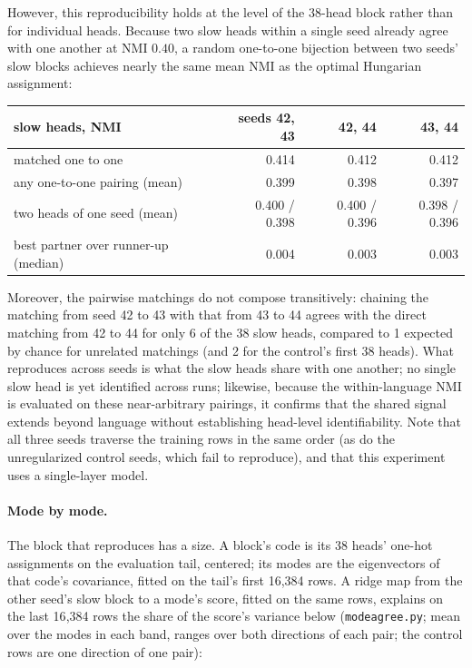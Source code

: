 However, this reproducibility holds at the level of the 38-head block
rather than for individual heads. Because two slow heads within a single
seed already agree with one another at NMI $0.40$, a random one-to-one
bijection between two seeds' slow blocks achieves nearly the same mean
NMI as the optimal Hungarian assignment:

\begin{center}\small\setlength{\tabcolsep}{4pt}
\begin{tabular}{@{}lrrr@{}}
\toprule
slow heads, NMI & seeds 42, 43 & 42, 44 & 43, 44 \\
\midrule
matched one to one & 0.414 & 0.412 & 0.412 \\
any one-to-one pairing (mean) & 0.399 & 0.398 & 0.397 \\
two heads of one seed (mean) & 0.400 / 0.398 & 0.400 / 0.396 & 0.398 / 0.396 \\
best partner over runner-up (median) & 0.004 & 0.003 & 0.003 \\
\bottomrule
\end{tabular}
\end{center}

\noindent Moreover, the pairwise matchings do not compose transitively:
chaining the matching from seed 42 to 43 with that from 43 to 44 agrees
with the direct matching from 42 to 44 for only 6 of the 38 slow heads,
compared to 1 expected by chance for unrelated matchings (and 2 for the
control's first 38 heads). What reproduces across seeds is what the slow heads
share with one another; no single slow head is yet identified across runs;
likewise, because the within-language NMI is evaluated on these
near-arbitrary pairings, it confirms that the shared signal extends
beyond language without establishing head-level identifiability. Note
that all three seeds traverse the training rows in the same order (as do
the unregularized control seeds, which fail to reproduce), and that this
experiment uses a single-layer model.

\paragraph{Mode by mode.}
\label{sec:slowmodes}
The block that reproduces has a size. A block's code is its 38 heads'
one-hot assignments on the evaluation tail, centered; its modes are the
eigenvectors of that code's covariance, fitted on the tail's first
16{,}384 rows. A ridge map from the other seed's slow block to a mode's
score, fitted on the same rows, explains on the last 16{,}384 rows the
share of the score's variance below (\texttt{modeagree.py}; mean over the
modes in each band, ranges over both directions of each pair; the control
rows are one direction of one pair):

